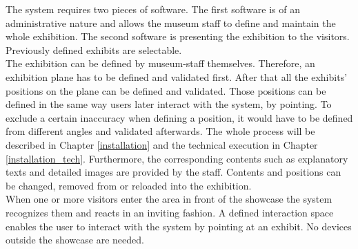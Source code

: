 The system requires two pieces of software. The first software is of an administrative nature and allows the museum staff to define and maintain the whole exhibition. The second software is presenting the exhibition to the visitors. Previously defined exhibits are selectable.
\\
The exhibition can be defined by museum-staff themselves. Therefore, an exhibition plane has to be defined and validated first. After that all the exhibits' positions on the plane can be defined and validated. Those positions can be defined in the same way users later interact with the system, by pointing. To exclude a certain inaccuracy when defining a position, it would have to be defined from different angles and validated afterwards. The whole process will be described in Chapter \ref{installation} and the technical execution in Chapter \ref{installation_tech}. Furthermore, the corresponding contents such as explanatory texts and detailed images are provided by the staff. Contents and positions can be changed, removed from or reloaded into the exhibition.
\\
When one or more visitors enter the area in front of the showcase the system recognizes them and reacts in an inviting fashion. A defined interaction space enables the user to interact with the system by pointing at an exhibit. No devices outside the showcase are needed. 

